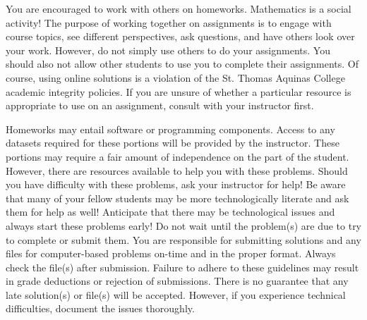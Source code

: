 \documentclass[11pt,letterpaper]{article}
\begin{document}
You are encouraged to work with others on homeworks. Mathematics is a social activity! The purpose of working together on assignments is to engage with course topics, see different perspectives, ask questions, and have others look over your work. However, do not simply use others to do your assignments. You should also not allow other students to use you to complete their assignments. Of course, using online solutions is a violation of the St. Thomas Aquinas College academic integrity policies. If you are unsure of whether a particular resource is appropriate to use on an assignment, consult with your instructor first. \pspace

Homeworks may entail software or programming components. Access to any datasets required for these portions will be provided by the instructor. These portions may require a fair amount of independence on the part of the student. However, there are resources available to help you with these problems. Should you have difficulty with these problems, ask your instructor for help! Be aware that many of your fellow students may be more technologically literate and ask them for help as well! Anticipate that there may be technological issues and always start these problems early! Do not wait until the problem(s) are due to try to complete or submit them. You are responsible for submitting solutions and any files for computer-based problems on-time and in the proper format. Always check the file(s) after submission. Failure to adhere to these guidelines may result in grade deductions or rejection of submissions. There is no guarantee that any late solution(s) or file(s) will be accepted. However, if you experience technical difficulties, document the issues thoroughly. 
\sectionbreak
\end{document}
